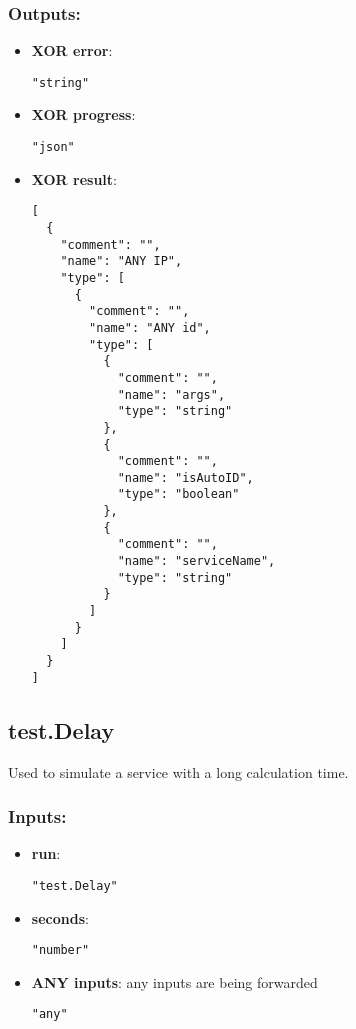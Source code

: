 \subsubsection*{Outputs:}
\begin{itemize}
    \item \textbf{XOR error}: 
\begin{lstlisting}
"string"
\end{lstlisting}
    \item \textbf{XOR progress}: 
\begin{lstlisting}
"json"
\end{lstlisting}
    \item \textbf{XOR result}: 
\begin{lstlisting}
[
  {
    "comment": "", 
    "name": "ANY IP", 
    "type": [
      {
        "comment": "", 
        "name": "ANY id", 
        "type": [
          {
            "comment": "", 
            "name": "args", 
            "type": "string"
          }, 
          {
            "comment": "", 
            "name": "isAutoID", 
            "type": "boolean"
          }, 
          {
            "comment": "", 
            "name": "serviceName", 
            "type": "string"
          }
        ]
      }
    ]
  }
]
\end{lstlisting}
  \end{itemize}

\subsection{test.Delay}
Used to simulate a service with a long calculation time.
\subsubsection*{Inputs:}
\begin{itemize}
    \item \textbf{run}: 
\begin{lstlisting}
"test.Delay"
\end{lstlisting}
    \item \textbf{seconds}: 
\begin{lstlisting}
"number"
\end{lstlisting}
    \item \textbf{ANY inputs}: any inputs are being forwarded
\begin{lstlisting}
"any"
\end{lstlisting}
  \end{itemize}

